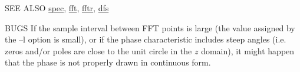 \begin{qsection}{SEE ALSO}
\hyperlink{spec}{spec},
\hyperlink{fft}{fft},
\hyperlink{fftr}{fftr},
\hyperlink{dfs}{dfs}
\end{qsection}

\begin{qsection}{BUGS}
If the sample interval between FFT points is large
(the value assigned by the --l option is small),
or if the phase characteristic includes steep angles
(i.e. zeros and/or poles are close to the unit circle in the $z$
 domain), it might happen that the phase is not properly drawn in continuous form.
\end{qsection}
